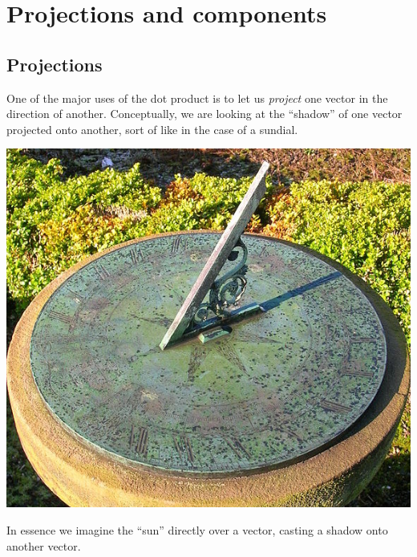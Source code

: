 \documentclass{ximera}
\begin{document}
\section{Projections and components}

\subsection{Projections}
One of the major uses of the dot product is to let us \textit{project}
one vector in the direction of another. Conceptually, we are looking
at the ``shadow'' of one vector projected onto another, sort of like
in the case of a sundial.
\begin{image}%
  \includegraphics{sundial.jpg}
\end{image}
In essence we imagine the ``sun'' directly over a vector, casting a shadow onto another vector.
\begin{image}
\end{image}
\end{document}
